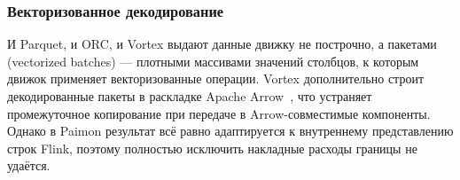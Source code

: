 \subsubsection{Векторизованное декодирование}

И Parquet, и ORC, и Vortex выдают данные движку не построчно, а пакетами
(vectorized batches) --- плотными массивами значений столбцов, к которым движок
применяет векторизованные операции. Vortex дополнительно строит декодированные
пакеты в раскладке Apache Arrow~\cite{arrow-cdata}, что устраняет промежуточное
копирование при передаче в Arrow-совместимые компоненты. Однако в Paimon результат
всё равно адаптируется к внутреннему представлению строк Flink, поэтому полностью
исключить накладные расходы границы не удаётся.
